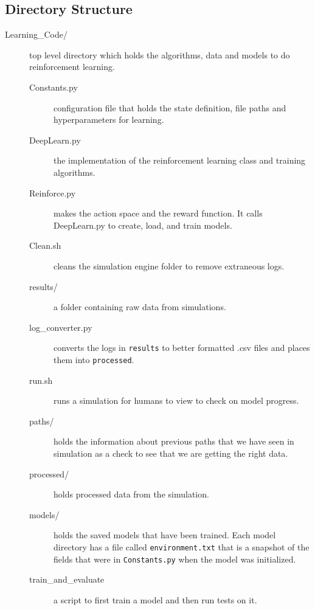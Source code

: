 \documentclass[onecolumn,letterpaper,11pt]{article}
\begin{document}
\subsection{Directory Structure}
\begin{description}
	\item[Learning\_Code/] top level directory which holds the algorithms, data and models to do reinforcement learning.
	\begin{description}
		\item[Constants.py] configuration file that holds the state definition, file paths and hyperparameters for learning.
		\vspace{0.15in}
		\item[DeepLearn.py] the implementation of the reinforcement learning class and training algorithms.
		\vspace{0.15in}
		\item[Reinforce.py] makes the action space and the reward function. It calls DeepLearn.py to create, load, and train models.
		\vspace{0.15in}
		\item[Clean.sh] cleans the simulation engine folder to remove extraneous logs.
		\vspace{0.15in}
		\item[results/] a folder containing raw data from simulations.
		\vspace{0.15in}
		\item[log\_converter.py] converts the logs in \texttt{results} to better formatted .csv files and places them into \texttt{processed}.
		\vspace{0.15in}
		\item[run.sh] runs a simulation for humans to view to check on model progress.
		\vspace{0.15in}
		\item[paths/] holds the information about previous paths that we have seen in simulation as a check to see that we are getting the right data.
		\vspace{0.15in}
		\item[processed/] holds processed data from the simulation.
		\vspace{0.15in}
		\item[models/] holds the saved models that have been trained. Each model directory has a file called \texttt{environment.txt} that is a snapshot of the fields that were in \texttt{Constants.py} when the model was initialized.
		\item[train\_and\_evaluate] a script to first train a model and then run tests on it. 

\end{description}
\end{description}
\end{document}
